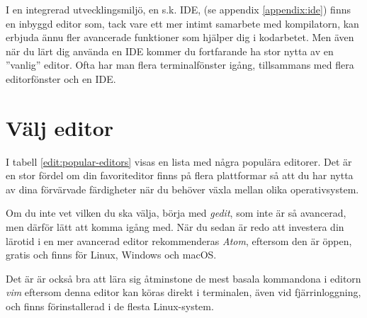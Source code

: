 I en integrerad utvecklingsmiljö, en s.k. IDE, (se appendix \ref{appendix:ide}) finns en inbyggd editor som, tack vare ett mer intimt samarbete med kompilatorn, kan erbjuda ännu fler avancerade funktioner som hjälper dig i kodarbetet. Men även när du lärt dig använda en IDE kommer du fortfarande ha stor nytta av en ''vanlig'' editor. Ofta har man flera terminalfönster igång, tillsammans med flera editorfönster och en IDE. 

\section{Välj editor}

I tabell \ref{edit:popular-editors} visas en lista med några populära editorer. Det är en stor fördel om din favoriteditor finns på flera plattformar så att du har nytta av dina förvärvade färdigheter när du behöver växla mellan olika operativsystem. 

Om du inte vet vilken du ska välja, börja med \textit{gedit}, som inte är så avancerad, men därför lätt att komma igång med. När du sedan är redo att investera din lärotid i en mer avancerad editor rekommenderas \textit{Atom}, eftersom den är öppen, gratis och finns för Linux, Windows och macOS. 

Det är är också bra att lära sig åtminstone de mest basala kommandona i editorn \textit{vim} eftersom denna  editor kan köras direkt i terminalen, även vid fjärrinloggning, och finns förinstallerad i de flesta Linux-system.


